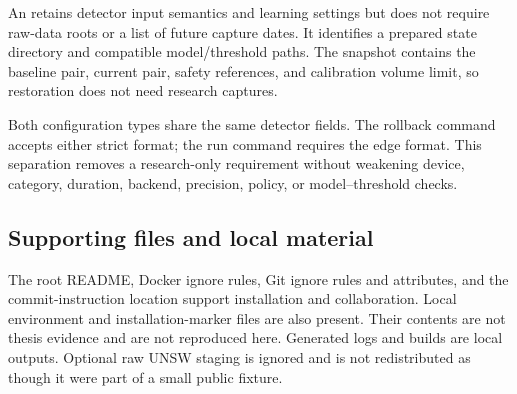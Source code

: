 An  retains detector input semantics and learning settings but
does not require raw-data roots or a list of future capture dates. It identifies
a prepared state directory and compatible model/threshold paths. The snapshot
contains the baseline pair, current pair, safety references, and calibration
volume limit, so restoration does not need research captures.

Both configuration types share the same detector fields. The rollback command
accepts either strict format; the run command requires the edge format.
This separation removes a research-only requirement without weakening device,
category, duration, backend, precision, policy, or model--threshold checks.

\subsection{Supporting files and local material}

The root README, Docker ignore rules, Git ignore rules and attributes, and the
commit-instruction location support installation and collaboration. Local
environment and installation-marker files are also present. Their contents are
not thesis evidence and are not reproduced here. Generated logs and
 builds are local outputs. Optional raw UNSW staging is ignored and
is not redistributed as though it were part of a small public fixture.
